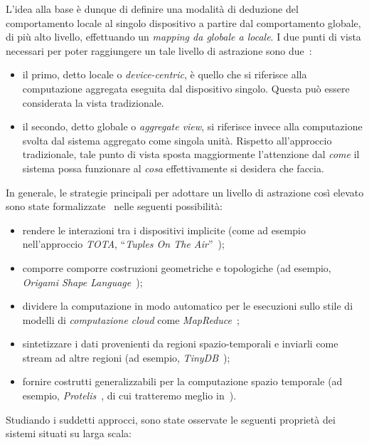 L'idea alla base è dunque di definire una modalità di deduzione del comportamento locale al singolo dispositivo a partire dal comportamento globale, di più alto livello, effettuando un \emph{mapping da globale a locale}.
I due punti di vista necessari per poter raggiungere un tale livello di astrazione sono due~\cite{aggregatescala-pmldc2016}:

\begin{itemize}
    \item
        il primo, detto locale o \emph{device-centric}, è quello che si riferisce alla computazione aggregata eseguita dal dispositivo singolo.
        Questa può essere considerata la vista tradizionale.
    \item
        il secondo, detto globale o \emph{aggregate view}, si riferisce invece alla computazione svolta dal sistema aggregato come singola unità.
        Rispetto all'approccio tradizionale, tale punto di vista sposta maggiormente l'attenzione dal \emph{come} il sistema possa funzionare al \emph{cosa} effettivamente si desidera che faccia.
\end{itemize}

In generale, le strategie principali per adottare un livello di astrazione così elevato sono state formalizzate~\cite{7274429} nelle seguenti possibilità:

\begin{itemize}
  \item rendere le interazioni tra i dispositivi implicite (come ad esempio nell'approccio \emph{TOTA}, ``\emph{Tuples On The Air}''~\cite{10.1145/1538942.1538945});
  \item comporre comporre costruzioni geometriche e topologiche (ad esempio, \emph{Origami Shape Language}~\cite{nagpal2001programmable});
  \item dividere la computazione in modo automatico per le esecuzioni sullo stile di modelli di \emph{computazione cloud} come \emph{MapReduce}~\cite{10.1145/1327452.1327492};
  \item sintetizzare i dati provenienti da regioni spazio-temporali e inviarli come stream ad altre regioni (ad esempio, \emph{TinyDB}~\cite{1017485});
  \item fornire costrutti generalizzabili per la computazione spazio temporale (ad esempio, \emph{Protelis}~\cite{PianiniSASOTutorial2017}, di cui tratteremo meglio in~).
\end{itemize}

Studiando i suddetti approcci, sono state osservate le seguenti proprietà dei sistemi situati su larga scala:

